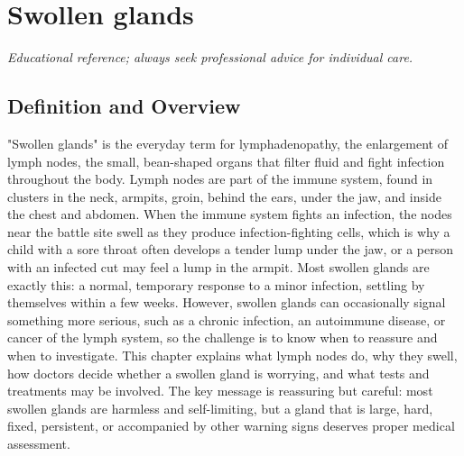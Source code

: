 \chapter{Swollen glands}

\medskip
\noindent\textit{Educational reference; always seek professional advice for individual care.}

\section*{Definition and Overview}
"Swollen glands" is the everyday term for lymphadenopathy, the enlargement of lymph nodes, the small, bean-shaped organs that filter fluid and fight infection throughout the body. Lymph nodes are part of the immune system, found in clusters in the neck, armpits, groin, behind the ears, under the jaw, and inside the chest and abdomen. When the immune system fights an infection, the nodes near the battle site swell as they produce infection-fighting cells, which is why a child with a sore throat often develops a tender lump under the jaw, or a person with an infected cut may feel a lump in the armpit. Most swollen glands are exactly this: a normal, temporary response to a minor infection, settling by themselves within a few weeks. However, swollen glands can occasionally signal something more serious, such as a chronic infection, an autoimmune disease, or cancer of the lymph system, so the challenge is to know when to reassure and when to investigate. This chapter explains what lymph nodes do, why they swell, how doctors decide whether a swollen gland is worrying, and what tests and treatments may be involved. The key message is reassuring but careful: most swollen glands are harmless and self-limiting, but a gland that is large, hard, fixed, persistent, or accompanied by other warning signs deserves proper medical assessment.

